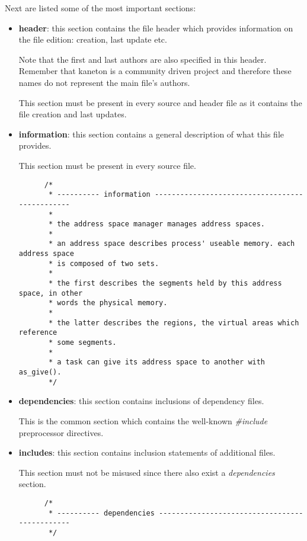 Next are listed some of the most important sections:

\begin{itemize}
  \item
    \textbf{header}: this section contains the file header which provides
    information on the file edition: creation, last update etc.

    \-

    Note that the first and last authors are also specified in this header.
    Remember that kaneton is a community driven project and therefore these
    names do not represent the main file's authors.

    \-

    This section must be present in every source and header file as it
    contains the file creation and last updates.
  \item
    \textbf{information}: this section contains a general description of
    what this file provides.

    \-

    This section must be present in every source file.

    \begin{verbatim}
      /*
       * ---------- information -----------------------------------------------
       *
       * the address space manager manages address spaces.
       *
       * an address space describes process' useable memory. each address space
       * is composed of two sets.
       *
       * the first describes the segments held by this address space, in other
       * words the physical memory.
       *
       * the latter describes the regions, the virtual areas which reference
       * some segments.
       *
       * a task can give its address space to another with as_give().
       */
    \end{verbatim}
  \item
    \textbf{dependencies}: this section contains inclusions of dependency
    files.

    \-

    This is the common section which contains the well-known \textit{\#include}
    preprocessor directives.
  \item
    \textbf{includes}: this section contains inclusion statements of additional
    files.

    \-

    This section must not be misused since there also exist a
    \textit{dependencies} section.

    \begin{verbatim}
      /*
       * ---------- dependencies ----------------------------------------------
       */


\end{verbatim}
\end{itemize}
